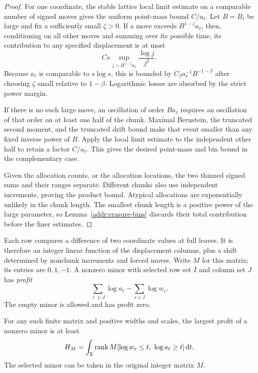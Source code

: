 \begin{proof}
For one coordinate, the stable lattice local limit estimate on a
comparable number of signed moves gives the uniform point-mass
bound $C/a_\ell$.  Let $B=B_\ell$ be large and fix a sufficiently
small $\zeta>0$.  If a move exceeds $B^{1-\zeta}a_\ell$, then,
conditioning on all other moves and summing over its possible time,
its contribution to any specified displacement is at most
\[
 Cs\sup_{j>B^{1-\zeta}a_\ell}\frac{\log j}{j^2}.
\]
Because $a_\ell$ is comparable to $s\log s$, this is bounded
by $C_\beta a_\ell^{-1}B^{-1-\beta}$ after choosing
$\zeta$ small relative to $1-\beta$.  Logarithmic losses are
absorbed by the strict power margin.

If there is no such large move, an oscillation of order $Ba_\ell$
requires an oscillation of that order on at least one half of the
chunk.  Maximal Bernstein, the truncated second moment, and the
truncated drift bound make that event smaller than any fixed inverse
power of $B$.  Apply the local limit estimate to the independent
other half to retain a factor $C/a_\ell$.  This gives the desired
point-mass and bin bound in the complementary case.

Given the allocation counts, or the allocation locations, the two
thinned signed sums and their ranges separate.  Different chunks
also use independent increments, proving the product bound.
Atypical allocations are exponentially unlikely in the chunk length.
The smallest chunk length is a positive power of the large parameter,
so Lemma~\ref{addr:erasure-bins} discards their total contribution
before the finer estimates.
\end{proof}

Each row compares a difference of two coordinate values at full
leaves.  It is therefore an integer linear function of the displacement
columns, plus a shift determined by nonchunk increments and forced
moves.  Write $M$ for this matrix; its entries are $0,1,-1$.
A nonzero minor with selected row set $I$ and column set $J$ has
\emph{profit}
\[
                   \sum_{\ell\in J}\log a_\ell
                         -\sum_{e\in I}\log w_e.
\]
The empty minor is allowed and has profit zero.

\begin{lemma}\label{addr:weighted-rank}
For any such finite matrix and positive widths and scales, the
largest profit of a nonzero minor is at least
\begin{equation}\label{addr:rank-integral}
 H_M=\int_{\mathbb R}
       \operatorname{rank} M[\log w_e\le t,\ \log a_\ell\ge t]\,\mathrm d t.
\end{equation}
The selected minor can be taken in the original integer matrix $M$.
\end{lemma}

